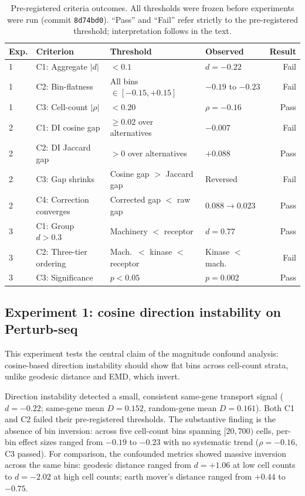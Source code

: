 \documentclass[11pt]{article}
\begin{document}
\begin{table}[htbp]
\centering
\caption{Pre-registered criteria outcomes. All thresholds were frozen
before experiments were run (commit \texttt{8d74bd0}). ``Pass'' and
``Fail'' refer strictly to the pre-registered threshold; interpretation
follows in the text.}
\label{tab:prereg_outcomes}
\small
\begin{tabular}{llllr}
\toprule
\textbf{Exp.} & \textbf{Criterion} & \textbf{Threshold} & \textbf{Observed} & \textbf{Result} \\
\midrule
1 & C1: Aggregate $|d|$ & $< 0.1$ & $d = -0.22$ & Fail \\
1 & C2: Bin-flatness & All bins $\in [-0.15, +0.15]$ & $-0.19$ to $-0.23$ & Fail \\
1 & C3: Cell-count $|\rho|$ & $< 0.20$ & $\rho = -0.16$ & Pass \\
\midrule
2 & C1: DI cosine gap & $\geq 0.02$ over alternatives & $-0.007$ & Fail \\
2 & C2: DI Jaccard gap & $> 0$ over alternatives & $+0.088$ & Pass \\
2 & C3: Gap shrinks & Cosine gap $>$ Jaccard gap & Reversed & Fail \\
2 & C4: Correction converges & Corrected gap $<$ raw gap & $0.088 \to 0.023$ & Pass \\
\midrule
3 & C1: Group $d > 0.3$ & Machinery $<$ receptor & $d = 0.77$ & Pass \\
3 & C2: Three-tier ordering & Mach.\ $<$ kinase $<$ receptor & Kinase $<$ mach. & Fail \\
3 & C3: Significance & $p < 0.05$ & $p = 0.002$ & Pass \\
\bottomrule
\end{tabular}
\end{table}

\subsection{Experiment 1: cosine direction instability on Perturb-seq}

This experiment tests the central claim of the magnitude confound
analysis: cosine-based direction instability should show flat bins across
cell-count strata, unlike geodesic distance and EMD, which invert.

Direction instability detected a small, consistent same-gene transport
signal ($d = -0.22$; same-gene mean $D = 0.152$, random-gene mean $D =
0.161$). Both C1 and C2 failed their pre-registered thresholds.
The substantive finding is the absence of bin inversion: across five
cell-count bins spanning $[20, 700)$ cells, per-bin effect sizes ranged
from $-0.19$ to $-0.23$ with no systematic trend ($\rho = -0.16$, C3
passed). For comparison, the confounded metrics showed massive inversion
across the same bins: geodesic distance ranged from $d = +1.06$ at low
cell counts to $d = -2.02$ at high cell counts; earth mover's distance
ranged from $+0.44$ to $-0.75$.
\end{document}
